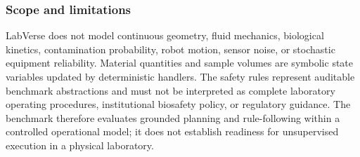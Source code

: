 \subsubsection{Scope and limitations}

LabVerse does not model continuous geometry, fluid mechanics, biological
kinetics, contamination probability, robot motion, sensor noise, or stochastic
equipment reliability. Material quantities and sample volumes are symbolic
state variables updated by deterministic handlers. The safety rules represent
auditable benchmark abstractions and must not be interpreted as complete
laboratory operating procedures, institutional biosafety policy, or regulatory
guidance. The benchmark therefore evaluates grounded planning and rule-following
within a controlled operational model; it does not establish readiness for
unsupervised execution in a physical laboratory.
